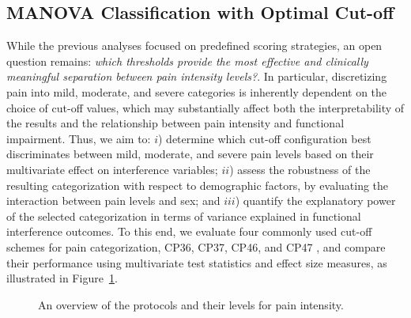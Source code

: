 \documentclass[preprint,12pt,authoryear]{elsarticle}
\begin{document}
\subsection{MANOVA Classification with Optimal Cut-off}
While the previous analyses focused on predefined scoring strategies, an open question remains: \textit{which thresholds provide the most effective and clinically meaningful separation between pain intensity levels?}. In particular, discretizing pain into mild, moderate, and severe categories is inherently dependent on the choice of cut-off values, which may substantially affect both the interpretability of the results and the relationship between pain intensity and functional impairment. Thus, we aim to: $i$) determine which cut-off configuration best discriminates between mild, moderate, and severe pain levels based on their multivariate effect on interference variables; $ii$) assess the robustness of the resulting categorization with respect to demographic factors, by evaluating the interaction between pain levels and sex; and $iii$) quantify the explanatory power of the selected categorization in terms of variance explained in functional interference outcomes. To this end, we evaluate four commonly used cut-off schemes for pain categorization, CP36, CP37, CP46, and CP47 \citep{serlin1995cancer, zelman2003development}, and compare their performance using multivariate test statistics and effect size measures, as illustrated in Figure~\ref{fig:protocolli_dolore}. 

 \begin{figure}[b!]
    \centering
    \caption{An overview of the protocols and their levels for pain intensity.}
    \label{fig:protocolli_dolore}
\end{figure}
\end{document}
